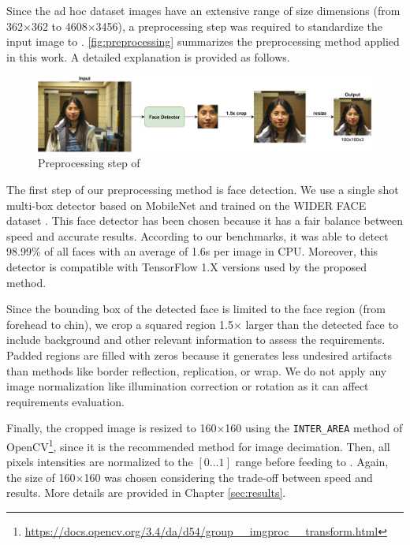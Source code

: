 Since the ad hoc dataset images have an extensive range of size dimensions (from 362$\times$362 to 4608$\times$3456), a preprocessing step was required to standardize the input image to \methodname. \autoref{fig:preprocessing} summarizes the preprocessing method applied in this work. A detailed explanation is provided as follows.

\begin{figure}
    \centering
    \includegraphics[width=\linewidth]{images/preprocessing.pdf}
    \caption{Preprocessing step of \methodname}
    \label{fig:preprocessing}
\end{figure}

The first step of our preprocessing method is face detection. We use a single shot multi-box detector based on MobileNet \citep{yeephycho} and trained on the WIDER FACE dataset \citep{yang2016wider}. This face detector has been chosen because it has a fair balance between speed and accurate results. According to our benchmarks, it was able to detect 98.99\% of all faces with an average of 1.6s per image in CPU. Moreover, this detector is compatible with TensorFlow 1.X versions used by the proposed method. 

Since the bounding box of the detected face is limited to the face region (from forehead to chin), we crop a squared region 1.5$\times$ larger than the detected face to include background and other relevant information to assess the requirements. Padded regions are filled with zeros because it generates less undesired artifacts than methods like border reflection, replication, or wrap. We do not apply any image normalization like illumination correction or rotation as it can affect requirements evaluation. 

Finally, the cropped image is resized to 160$\times$160 using the \texttt{INTER\_AREA} method of OpenCV\footnote{\url{https://docs.opencv.org/3.4/da/d54/group__imgproc__transform.html}}, since it is the recommended method for image decimation. Then, all pixels intensities are normalized to the $[0...1]$ range before feeding to \methodname. Again, the size of 160$\times$160 was chosen considering the trade-off between speed and results. More details are provided in Chapter \ref{sec:results}. 

